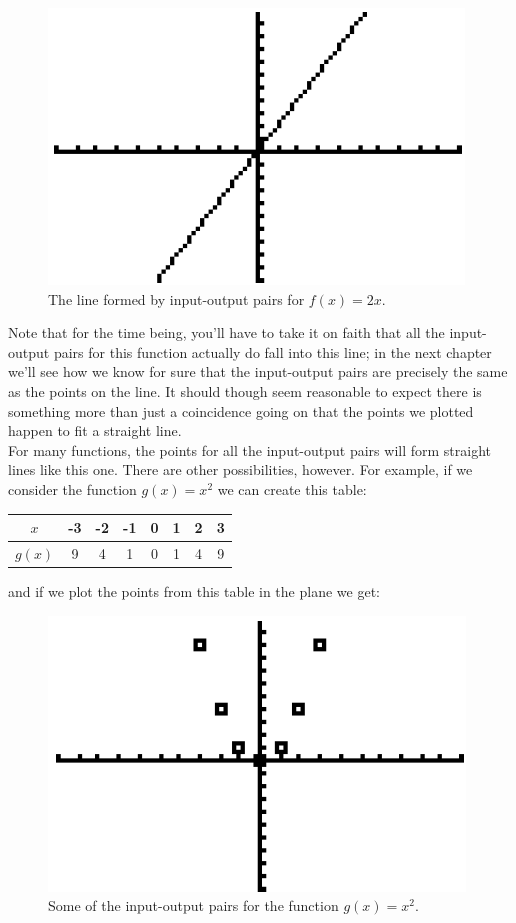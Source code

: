 \begin{figure}[H]
	\centering
	\includegraphics[scale=1.0]{Sections/FunctionsandGraphsImages/Figure06.png}
	\caption{The line formed by input-output pairs for $f(x)=2x$.}
\end{figure}

Note that for the time being, you’ll have to take it on faith that all the input-output pairs for this function actually do fall into this line; in the next chapter we’ll see how we know for sure that the input-output pairs are precisely the same as the points on the line. It should though seem
reasonable to expect there is something more than just a coincidence going on that the points we plotted happen to fit a straight line.\\

For many functions, the points for all the input-output pairs will form straight lines like this one. There are other possibilities, however. For example, if we consider the function $g(x)=x^2$ we can create this table:

\begin{center}
	\begin{tabular}{c|c|c|c|c|c|c|c}
		$x$ & -3 & -2 & -1 & 0 & 1 & 2 & 3\\
		\hline
		$g(x)$ & 9 & 4 & 1 & 0 & 1 & 4 & 9
	\end{tabular}
\end{center}

and if we plot the points from this table in the plane we get:

\begin{figure}[H]
	\centering
	\includegraphics[scale=1.0]{Sections/FunctionsandGraphsImages/Figure07.png}
	\caption{Some of the input-output pairs for the function $g(x)=x^2$.}
\end{figure}

